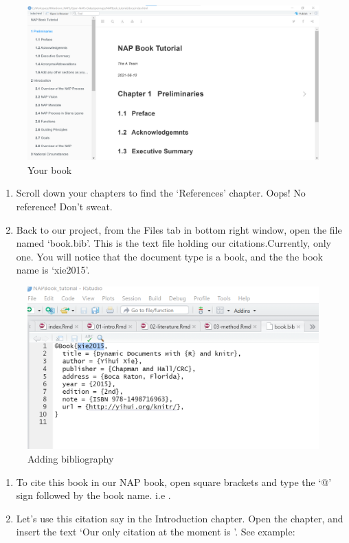 \documentclass[
]{book}
\providecommand{\tightlist}{%
  \setlength{\itemsep}{0pt}\setlength{\parskip}{0pt}}
\begin{document}
\begin{figure}
\centering
\includegraphics{tutorial_screenshots/built_book.png}
\caption{Your book}
\end{figure}

\begin{enumerate}
\def\labelenumi{\arabic{enumi}.}
\setcounter{enumi}{27}
\tightlist
\item
  Scroll down your chapters to find the `References' chapter. Oops! No reference! Don't sweat.\\
\item
  Back to our project, from the Files tab in bottom right window, open the file named `book.bib'. This is the text file holding our citations.Currently, only one. You will notice that the document type is a book, and the the book name is `xie2015'.
\end{enumerate}

\begin{figure}
\centering
\includegraphics{tutorial_screenshots/add_citation.png}
\caption{Adding bibliography}
\end{figure}

\begin{enumerate}
\def\labelenumi{\arabic{enumi}.}
\setcounter{enumi}{29}
\tightlist
\item
  To cite this book in our NAP book, open square brackets and type the `@' sign followed by the book name. i.e \citep{xie2015}.\\
\item
  Let's use this citation say in the Introduction chapter. Open the chapter, and insert the text `Our only citation at the moment is \citep{xie2015}'. See example:
\end{enumerate}
\end{document}
